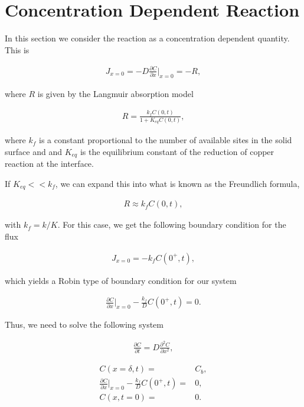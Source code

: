 \section{Concentration Dependent Reaction}
	
	In this section we consider the reaction as a concentration dependent quantity. This is
	
	
	\begin{align}
		J_{x=0} = -D\frac{\partial C}{\partial x}\big|_{x=0} = -R,
	\end{align}
	
	where $R$ is given by the Langmuir absorption model \cite{langmuir}
	
	\begin{align}
		R = \frac{k_fC(0, t)}{1 + K_{eq}C(0, t)},
	\end{align} 
	
	where $k_f$ is a constant proportional to the number of available sites in the solid surface and  and $K_{eq}$ is the equilibrium constant of the reduction of copper reaction at the interface.
	
	If $K_{eq} << k_f$, we can expand this into what is known as the Freundlich formula,
	
	\begin{align}
		R \approx k_f C(0, t),
	\end{align} 
	
	with $k_f = k/K$. For this case, we get the following boundary condition for the flux
	
	\begin{align}
		J_{x=0} = -k_fC(0^+,t),
	\end{align}
	
	which yields a Robin type of boundary condition for our system
	
	\begin{align}
		 \frac{\partial C}{\partial x}\big|_{x=0} -\frac{k_f}{D}C(0^+,t) = 0.
	\end{align}
	
	Thus, we need to solve the following system
	
		
	\begin{align}
		\frac{\partial C}{\partial t} = D \frac{\partial^2 C}{\partial x^2},
		\label{eq:dynamic-system}
	\end{align}
	
	\begin{align}
		C(x = \delta, t) =& C_b,\\
		\frac{\partial C}{\partial x}\big|_{x=0} -\frac{k_f}{D}C(0^+,t) =& 0,\\
		C(x, t=0) =& 0.
		\label{eq:border-conditions-dynamic}
	\end{align}






